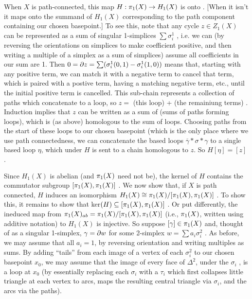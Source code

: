 \msk

When $X$ is path-connected, this map $H:\pi_1(X)\rightarrow H_1(X)$ is onto . [When it isn't it maps onto the 
summand of $H_1(X)$ corresponding to the path component containing our chosen basepoint.]
To see this, note that any cycle $z\in Z_1(X)$ can be represented as a sum of singular
1-simplices $\sum \sigma_i^1$ , i.e. we can (by reversing the orientations on simplices
to make coefficient positive, and then writing a multiple of a simplex as a sum of
simplices) assume all coefficients in our sum are 1. Then 
$0 = \partial z = \sum (\sigma_i^1(0,1) - \sigma_i^1(1,0))$ means that, starting with any positive term, 
we can match it with a 
negative term to cancel that term, which is paired with a postive term, having a matching negative term, etc.,
until the initial positive term is cancelled. This sub-chain represents a collection of paths which 
concatenate to a loop, so $z=$ (this loop) + (the remainiung terms) . Induction implies that
$z$ can be written as a sum of (sums of paths forming loops), which is (as above) homologous  to the
sum of loops. Choosing paths from the start of these loops to our chosen basepoint (which is the only
place where we use path connectedness, we can concatenate the based loops $\overline{\gamma}*\sigma*\gamma$
to a single based loop $\eta$, which under $H$ is sent to a chain homologous to $z$.
So $H[\eta] = [z]$ .

\msk 

Since $H_1(X)$ is abelian (and $\pi_1(X)$ need not be), the kernel of $H$ contains the
commutator subgroup $[\pi_1(X),\pi_1(X)]$ . 
We now show that, if $X$ is path connected,
$H$ induces an isomorphism $H_1(X) \cong \pi_1(X)/[\pi_1(X),\pi_1(X)]$ . 
To show this, it remains to show that  ker$(H)\subseteq [\pi_1(X),\pi_1(X)]$ . 
Or put differently, the ineduced map from $\pi_1(X)_{ab} = \pi_1(X)/[\pi_1(X),\pi_1(X)]$ 
(i.e., $\pi_1(X)$, written using additive notation) to $H_1(X)$  is injective.
So suppose $[\gamma]\in \pi_1(X)$ and, thought of as a singular 1-simplex, 
$\gamma = \partial w$ for some 2-simplex $w=\sum a_i\sigma_i^2$ . 
As before, we may assume that all $a_i=1$, by reversing orientation and writing multiples as 
sums. By adding ``tails'' from each image of a vertex of each $\sigma_i^2$ to our chosen 
basepoint $x_0$, we may assume that the image of every face of $\Delta^2$, under
the $\sigma_i$ , is a loop at $x_0$ (by essentially replacing each $\sigma_i$ with a $\tau_i$
which first collapses little triangle at each vertex to arcs, maps the resulting central triangle
via $\sigma_i$, and the arcs via the paths). 

